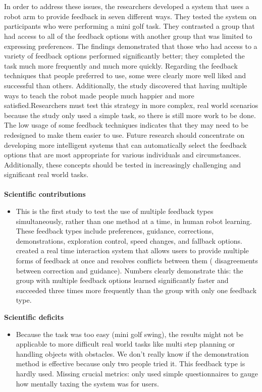 \documentclass[report.tex]{subfiles}
\begin{document}
\noindent\textbf{}\\\\In order to address these issues, the researchers developed a system that uses a robot arm to provide feedback in seven different ways. They tested the system on participants who were performing a mini golf task. They contrasted a group that had access to all of the feedback options with another group that was limited to expressing preferences. The findings demonstrated that those who had access to a variety of feedback options performed significantly better; they completed the task much more frequently and much more quickly. Regarding the feedback techniques that people preferred to use, some were clearly more well liked and successful than others. Additionally, the study discovered that having multiple ways to teach the robot made people much happier and more satisfied.Researchers must test this strategy in more complex, real world scenarios because the study only used a simple task, so there is still more work to be done. The low usage of some feedback techniques indicates that they may need to be redesigned to make them easier to use. Future research should concentrate on developing more intelligent systems that can automatically select the feedback options that are most appropriate for various individuals and circumstances. Additionally, these concepts should be tested in increasingly challenging and significant real world tasks.
\\\\




\noindent\textbf{Scientific contributions} 
\begin{itemize}
        \item This is the first study to test the use of multiple feedback types simultaneously, rather than one method at a time, in human robot learning. These feedback types include preferences, guidance, corrections, demonstrations, exploration control, speed changes, and fallback options.  created a real time interaction system that allows users to provide multiple forms of feedback at once and resolves conflicts between them ( disagreements between correction and guidance).  Numbers clearly demonstrate this: the group with multiple feedback options learned significantly faster and succeeded three times more frequently than the group with only one feedback type. 
        
\end{itemize}

\noindent\textbf{Scientific deficits} 
\begin{itemize}
        \item   Because the task was too easy (mini golf swing), the results might not be applicable to more difficult real world tasks like multi step planning or handling objects with obstacles. We don't really know if the demonstration method is effective because only two people tried it. This feedback type is hardly used. Missing crucial metrics: only used simple questionnaires to gauge how mentally taxing the system was for users. 
\end{itemize}
\end{document}
